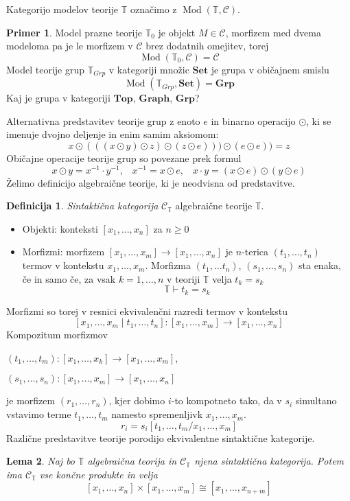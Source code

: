 \documentclass[12pt,a4paper]{book}
\theoremstyle{definition}
\newtheorem{definicija}{Definicija}[chapter]
\theoremstyle{plain}
\newtheorem{lema}[definicija]{Lema}
\theoremstyle{definition}
\newtheorem{primer}{Primer}[section]
\theoremstyle{remark}
\DeclareMathOperator{\Mod}{Mod}
\begin{document}
%
Kategorijo modelov teorije $\mathbb{T}$ označimo z $\Mod(\mathbb{T}, \mathcal{C})$.
%
\begin{primer}
Model prazne teorije $\mathbb{T}_0$ je objekt $M \in \mathcal{C}$, morfizem med dvema modeloma pa je le morfizem v $\mathcal{C}$ brez dodatnih omejitev, torej
$$\Mod(\mathbb{T}_0, \mathcal{C}) = \mathcal{C}$$
%
Model teorije grup $\mathbb{T}_{Grp}$ v kategoriji množic $\mathbf{Set}$ je grupa v običajnem smislu
$$\Mod(\mathbb{T}_{Grp}, \mathbf{Set}) = \mathbf{Grp}$$
%
Kaj je grupa v kategoriji $\mathbf{Top}$, $\mathbf{Graph}$, $\mathbf{Grp}$?
\end{primer}
%
Alternativna predstavitev teorije grup z enoto $e$ in binarno operacijo $\odot$, ki se imenuje dvojno deljenje in enim samim aksiomom:
$$x \odot (((x \odot y ) \odot z ) \odot ( z \odot e))) \odot (e \odot e) ) = z$$
Običajne operacije teorije grup so povezane prek formul
$$x \odot y = x^{-1} \cdot y^{-1} \text{,} \quad x^{-1} = x \odot e \text{,} \quad x \cdot y = (x \odot e) \odot (y \odot e)$$
%
Želimo definicijo algebraične teorije, ki je neodvisna od predstavitve.
%
\begin{definicija}
\emph{Sintaktična kategorija} $\mathcal{C}_\mathbb{T}$ algebraične teorije $\mathbb{T}$.
%
\begin{itemize}
\item Objekti: konteksti $[x_1, \ldots, x_n]$ za $n \geq 0$
%
\item Morfizmi: morfizem $[x_1, \ldots, x_m] \to [x_1, \ldots, x_n]$ je $n$-terica $(t_1, \ldots, t_n)$ termov v kontekstu $x_1, \ldots, x_m$. Morfizma $(t_1, \ldots t_n)$, $(s_1, \ldots, s_n)$ sta enaka, če in samo če, za vsak $k = 1, \ldots, n$ v teoriji $\mathbb{T}$ velja $t_k = s_k$
$$\mathbb{T} \vdash t_k = s_k$$
\end{itemize}
\end{definicija}
%
Morfizmi so torej v resnici ekvivalenčni razredi termov v kontekstu
$$[x_1, \ldots, x_m \mid t_1, \ldots, t_n] : [x_1, \ldots, x_m] \to [x_1, \ldots, x_n]$$
%
Kompozitum morfizmov
\begin{center}
\begin{description}
\item $(t_1, \ldots, t_m) : [x_1, \ldots, x_k] \to [x_1, \ldots, x_m]$,
\item $(s_1, \ldots, s_n) : [x_1, \ldots, x_m] \to [x_1, \ldots, x_n]$
\end{description}
\end{center}
je morfizem $(r_1, \ldots, r_n)$, kjer dobimo $i$-to kompotneto tako, da v $s_i$ simultano vstavimo terme $t_1, \ldots, t_m$ namesto spremenljivk $x_1, \ldots, x_m$.
$$r_i = s_i[t_1, \ldots, t_m / x_1, \ldots, x_m]$$
%
Različne predstavitve teorije porodijo ekvivalentne sintaktične kategorije.
%
\begin{lema}
Naj bo $\mathbb{T}$ algebraična teorija in $\mathcal{C}_\mathbb{T}$ njena sintaktična kategorija. Potem ima $\mathcal{C}_\mathbb{T}$ vse končne produkte in velja
$$[x_1, \ldots, x_n] \times [x_1, \ldots, x_m] \cong [x_1, \ldots, x_{n+m}]$$
\end{lema}
%
%
\end{document}
